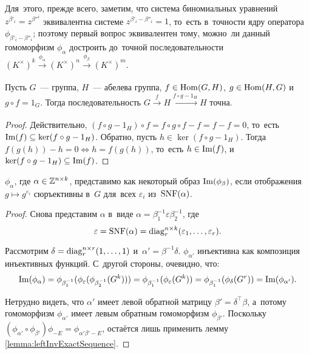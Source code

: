 Для~этого, прежде всего, заметим, что система биномиальных уравнений $z^{\beta'_i} = z^{\beta''^i}$ эквивалентна
системе $z^{\beta'_i - \beta''_i} = 1$, то~есть в~точности ядру оператора $\phi_{\beta'_i - \beta''_i}$;
поэтому первый вопрос эквивалентен тому, можно~ли данный гомоморфизм $\phi_\alpha$ достроить
до~точной последовательности $(K^\times)^k \xrightarrow[]{\phi_\alpha} (K^\times)^n \xrightarrow[]{\phi_\beta} (K^\times)^m$.

\begin{lemma}
\label{lemma:leftInvExactSequence}
  Пусть $G$~— группа, $H$~— абелева группа, $f \in \mathrm{Hom}(G, H)$, $g \in \mathrm{Hom}(H, G)$ и~$g \circ f = 1_G$.
  Тогда последовательность $G \xrightarrow[]{f} H \xrightarrow[]{f \circ g - 1_H} H$ точна.
\end{lemma}

\begin{proof}
  Действительно, $(f \circ g - 1_H) \circ f = f \circ g \circ f - f = f - f = 0$, то~есть $\mathrm{Im}(f) \subseteq \ker(f \circ g - 1_H)$. 
  Обратно, пусть $h \in \ker(f \circ g - 1_H)$. Тогда $f(g(h)) - h = 0 \Leftrightarrow h = f(g(h))$, то~есть $h \in \mathrm{Im}(f)$,
  и~$\ker(f \circ g - 1_H) \subseteq \mathrm{Im}(f)$.
\end{proof}

\begin{lemma}
  $\phi_\alpha$, где $\alpha \in \mathbb{Z}^{n \times k}$, представимо как некоторый образ $\mathrm{Im}(\phi_\beta)$,
  если отображения $g \mapsto g^{\varepsilon_i}$ сюръективны в~$G$ для~всех $\varepsilon_i$ из~$\mathrm{SNF}(\alpha)$.
\end{lemma}

\begin{proof}
  Снова представим $\alpha$ в~виде $\alpha = \beta_1^{-1} \varepsilon \beta_2^{-1}$, где
  \[
    \varepsilon = \mathrm{SNF}(\alpha) = \mathrm{diag}^{n \times k}_r(\varepsilon_1, \ldots, \varepsilon_r).
  \]

  Рассмотрим $\delta = \mathrm{diag}^{n \times r}_r(1, \ldots, 1)$ и~$\alpha' = \beta^{-1} \delta$.
  $\phi_{\alpha'}$ инъективна как композиция инъективных функций. С~другой стороны, очевидно, что:
  \[
    \mathrm{Im}(\phi_\alpha) = \phi_{\beta_1^{-1}} (\phi_\varepsilon (\phi_{\beta_2^{-1}} (G^k)))
                        = \phi_{\beta_1^{-1}} (\phi_\varepsilon (G^k))
                        = \phi_{\beta_1^{-1}} (\phi_{\delta} (G^r))
                        = \mathrm{Im}(\phi_{\alpha'}).
  \]

  Нетрудно видеть, что $\alpha'$ имеет левой обратной матрицу $\beta' = \delta^{\top} \beta$,
  а~потому гомоморфизм $\phi_{\alpha'}$ имеет левым обратным гомоморфизм $\phi_{\beta'}$.
  Поскольку $(\phi_{\alpha'} \circ \phi_{\beta'}) \phi_{-E} = \phi_{\alpha' \beta' - E}$, остаётся лишь применить лемму \ref{lemma:leftInvExactSequence}.
\end{proof}

